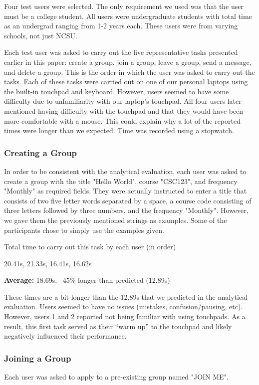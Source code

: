 \documentclass[conference]{IEEEtran}
\begin{document}
Four test users were selected.  The only requirement we used was that the user must be a college student.  All users were undergraduate students with total time as an undergrad ranging from 1-2 years each. These users were from varying schools, not just NCSU.

Each test user was asked to carry out the five representative tasks presented earlier in this paper: create a group, join a group, leave a group, send a message, and delete a group.  This is the order in which the user was asked to carry out the tasks.  Each of these tasks were carried out on one of our personal laptops using the built-in touchpad and keyboard.  However, users seemed to have some difficulty due to unfamiliarity with our laptop's touchpad.  All four users later mentioned having difficulty with the touchpad and that they would have been more comfortable with a mouse.  This could explain why a lot of the reported times were longer than we expected.  Time was recorded using a stopwatch.

\subsubsection{Creating a Group}
In order to be consistent with the analytical evaluation, each user was asked to create a group with the title "Hello World", course "CSC123", and frequency "Monthly" as required fields.  They were actually instructed to enter a title that consists of two five letter words separated by a space, a course code consisting of three letters followed by three numbers, and the frequency "Monthly".  However, we gave them the previously mentioned strings as examples.  Some of the participants chose to simply use the examples given.

Total time to carry out this task by each user (in order)

20.41s, 21.33s, 16.41s, 16.62s

\textbf{Average:} 18.69s, ~45\% longer than predicted (12.89s)

These times are a bit longer than the 12.89s that we predicted in the analytical evaluation.  Users seemed to have no issues (mistakes, confusion/pausing, etc).  However, users 1 and 2 reported not being familiar with using touchpads.  As a result, this first task served as their ``warm up'' to the touchpad and likely negatively influenced their performance.

\subsubsection{Joining a Group}
Each user was asked to apply to a pre-existing group named "JOIN ME". 
\end{document}
